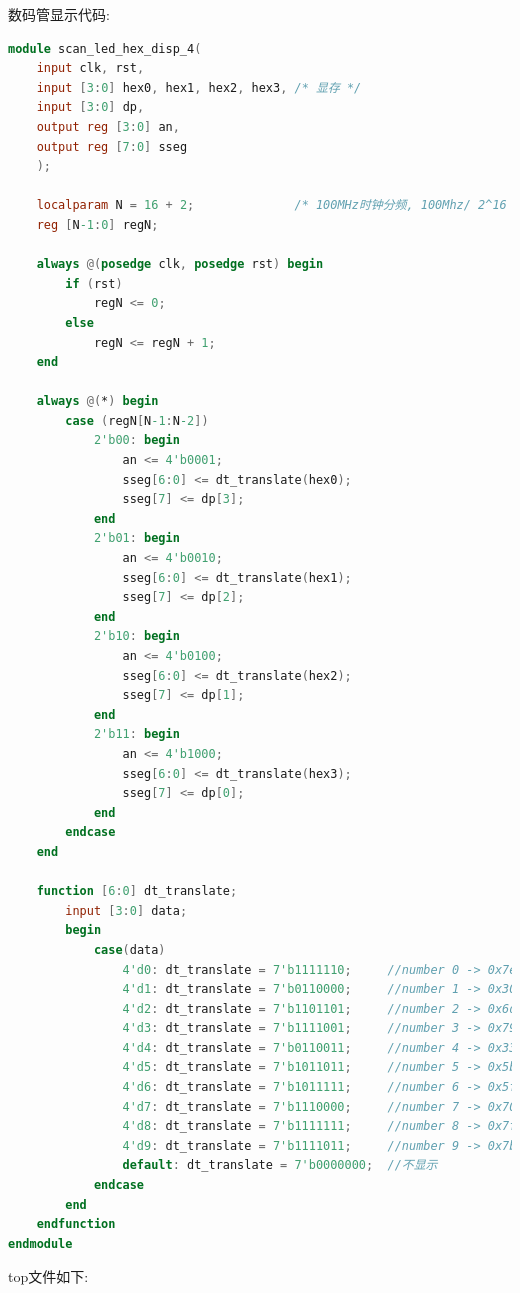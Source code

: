 \documentclass{article}
\begin{document}
数码管显示代码:
\begin{lstlisting}[language=Verilog, caption={数码管显示}]
module scan_led_hex_disp_4(
    input clk, rst,
    input [3:0] hex0, hex1, hex2, hex3, /* 显存 */
    input [3:0] dp,
    output reg [3:0] an,
    output reg [7:0] sseg
    );

    localparam N = 16 + 2;              /* 100MHz时钟分频, 100Mhz/ 2^16 */         
    reg [N-1:0] regN;

    always @(posedge clk, posedge rst) begin
        if (rst)
            regN <= 0;
        else 
            regN <= regN + 1;
    end

    always @(*) begin
        case (regN[N-1:N-2])
            2'b00: begin
                an <= 4'b0001;
                sseg[6:0] <= dt_translate(hex0);
                sseg[7] <= dp[3];
            end
            2'b01: begin
                an <= 4'b0010;
                sseg[6:0] <= dt_translate(hex1);
                sseg[7] <= dp[2];
            end
            2'b10: begin
                an <= 4'b0100;
                sseg[6:0] <= dt_translate(hex2);
                sseg[7] <= dp[1];
            end
            2'b11: begin
                an <= 4'b1000;
                sseg[6:0] <= dt_translate(hex3);
                sseg[7] <= dp[0];
            end 
        endcase
    end

    function [6:0] dt_translate;
        input [3:0] data;
        begin
            case(data)
                4'd0: dt_translate = 7'b1111110;     //number 0 -> 0x7e
                4'd1: dt_translate = 7'b0110000;     //number 1 -> 0x30
                4'd2: dt_translate = 7'b1101101;     //number 2 -> 0x6d
                4'd3: dt_translate = 7'b1111001;     //number 3 -> 0x79
                4'd4: dt_translate = 7'b0110011;     //number 4 -> 0x33
                4'd5: dt_translate = 7'b1011011;     //number 5 -> 0x5b
                4'd6: dt_translate = 7'b1011111;     //number 6 -> 0x5f
                4'd7: dt_translate = 7'b1110000;     //number 7 -> 0x70
                4'd8: dt_translate = 7'b1111111;     //number 8 -> 0x7f
                4'd9: dt_translate = 7'b1111011;     //number 9 -> 0x7b
                default: dt_translate = 7'b0000000;  //不显示
            endcase
        end
    endfunction
endmodule    
\end{lstlisting}
top文件如下:
\end{document}
